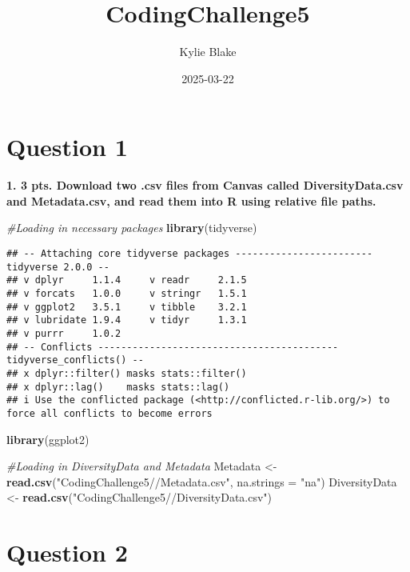 \documentclass[
]{article}
\title{CodingChallenge5}
\author{Kylie Blake}
\date{2025-03-22}
\newenvironment{Shaded}{\begin{snugshade}}{\end{snugshade}}
\newcommand{\AttributeTok}[1]{\textcolor[rgb]{0.13,0.29,0.53}{#1}}
\newcommand{\CommentTok}[1]{\textcolor[rgb]{0.56,0.35,0.01}{\textit{#1}}}
\newcommand{\FunctionTok}[1]{\textcolor[rgb]{0.13,0.29,0.53}{\textbf{#1}}}
\newcommand{\NormalTok}[1]{#1}
\newcommand{\OtherTok}[1]{\textcolor[rgb]{0.56,0.35,0.01}{#1}}
\newcommand{\StringTok}[1]{\textcolor[rgb]{0.31,0.60,0.02}{#1}}
\begin{document}
\maketitle

{
\setcounter{tocdepth}{2}
\tableofcontents
}
\section{Question 1}\label{question-1}

\textbf{1. 3 pts. Download two .csv files from Canvas called
DiversityData.csv and Metadata.csv, and read them into R using relative
file paths.}

\begin{Shaded}
\begin{Highlighting}[]
\CommentTok{\#Loading in necessary packages}
\FunctionTok{library}\NormalTok{(tidyverse)}
\end{Highlighting}
\end{Shaded}

\begin{verbatim}
## -- Attaching core tidyverse packages ------------------------ tidyverse 2.0.0 --
## v dplyr     1.1.4     v readr     2.1.5
## v forcats   1.0.0     v stringr   1.5.1
## v ggplot2   3.5.1     v tibble    3.2.1
## v lubridate 1.9.4     v tidyr     1.3.1
## v purrr     1.0.2     
## -- Conflicts ------------------------------------------ tidyverse_conflicts() --
## x dplyr::filter() masks stats::filter()
## x dplyr::lag()    masks stats::lag()
## i Use the conflicted package (<http://conflicted.r-lib.org/>) to force all conflicts to become errors
\end{verbatim}

\begin{Shaded}
\begin{Highlighting}[]
\FunctionTok{library}\NormalTok{(ggplot2)}

\CommentTok{\#Loading in DiversityData and Metadata}
\NormalTok{Metadata }\OtherTok{\textless{}{-}} \FunctionTok{read.csv}\NormalTok{(}\StringTok{"CodingChallenge5//Metadata.csv"}\NormalTok{, }\AttributeTok{na.strings =} \StringTok{"na"}\NormalTok{)}
\NormalTok{DiversityData }\OtherTok{\textless{}{-}}  \FunctionTok{read.csv}\NormalTok{(}\StringTok{"CodingChallenge5//DiversityData.csv"}\NormalTok{)}
\end{Highlighting}
\end{Shaded}

\section{Question 2}\label{question-2}
\end{document}
